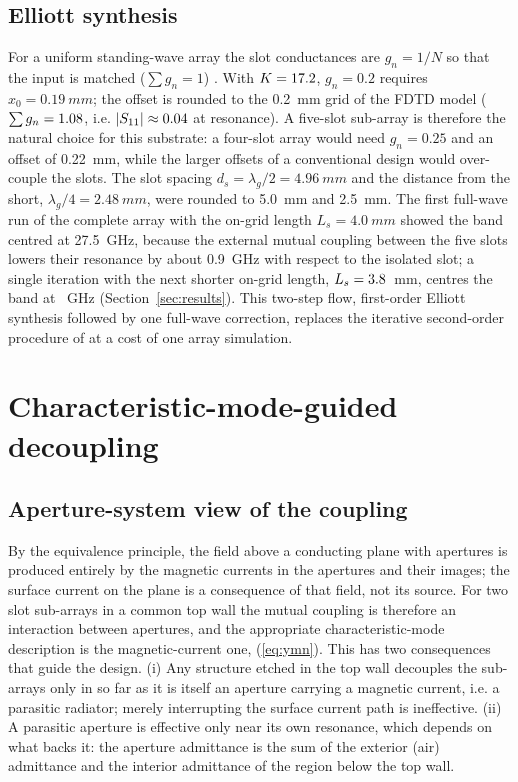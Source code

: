 \documentclass[preprint,12pt]{elsarticle}
\begin{document}
\subsection{Elliott synthesis}
For a uniform standing-wave array the slot conductances are $g_n = 1/N$ so that the input is matched ($\sum g_n = 1$) \cite{elliott1983,elliott2003}. With $K = 17.2$, $g_n = 0.2$ requires $x_0 = \SI{0.19}{mm}$; the offset is rounded to the \SI{0.2}{mm} grid of the FDTD model ($\sum g_n = 1.08$, i.e. $|S_{11}| \approx 0.04$ at resonance). A five-slot sub-array is therefore the natural choice for this substrate: a four-slot array would need $g_n = 0.25$ and an offset of \SI{0.22}{mm}, while the larger offsets of a conventional design would over-couple the slots. The slot spacing $d_s = \lambda_g/2 = \SI{4.96}{mm}$ and the distance from the short, $\lambda_g/4 = \SI{2.48}{mm}$, were rounded to \SI{5.0}{mm} and \SI{2.5}{mm}. The first full-wave run of the complete array with the on-grid length $L_s = \SI{4.0}{mm}$ showed the band centred at \SI{27.5}{GHz}, because the external mutual coupling between the five slots lowers their resonance by about \SI{0.9}{GHz} with respect to the isolated slot; a single iteration with the next shorter on-grid length, $L_s = 3.8$~mm, centres the band at \fcDec~GHz (Section~\ref{sec:results}). This two-step flow, first-order Elliott synthesis followed by one full-wave correction, replaces the iterative second-order procedure of \cite{elliott1983} at a cost of one array simulation.

\section{Characteristic-mode-guided decoupling}\label{sec:cma}
\subsection{Aperture-system view of the coupling}
By the equivalence principle, the field above a conducting plane with apertures is produced entirely by the magnetic currents in the apertures and their images; the surface current on the plane is a consequence of that field, not its source. For two slot sub-arrays in a common top wall the mutual coupling is therefore an interaction between apertures, and the appropriate characteristic-mode description is the magnetic-current one, (\ref{eq:ymn}). This has two consequences that guide the design. (i) Any structure etched in the top wall decouples the sub-arrays only in so far as it is itself an aperture carrying a magnetic current, i.e. a parasitic radiator; merely interrupting the surface current path is ineffective. (ii) A parasitic aperture is effective only near its own resonance, which depends on what backs it: the aperture admittance is the sum of the exterior (air) admittance and the interior admittance of the region below the top wall.
\end{document}
